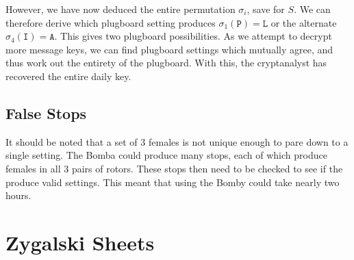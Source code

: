 \noindent However, we have now deduced the entire permutation
$\sigma_i$, save for $S$. We can therefore derive which plugboard
setting produces $\sigma_1(\texttt{P}) = \texttt{L}$ or the
alternate $\sigma_4(\texttt{I}) = \texttt{A}$. This gives two
plugboard possibilities. As we attempt to decrypt more message keys,
we can find plugboard settings which mutually agree, and thus work out the
entirety of the plugboard. With this, the cryptanalyst has recovered
the entire daily key.
\subsection{False Stops}
It should be noted that a set of $3$ females is not unique enough to
pare down to a single setting. The Bomba could produce many stops,
each of which produce females in all $3$ pairs of rotors. These stops
then need to be checked to see if the produce valid settings. This
meant that using the Bomby could take nearly two hours.

\section{Zygalski Sheets}

